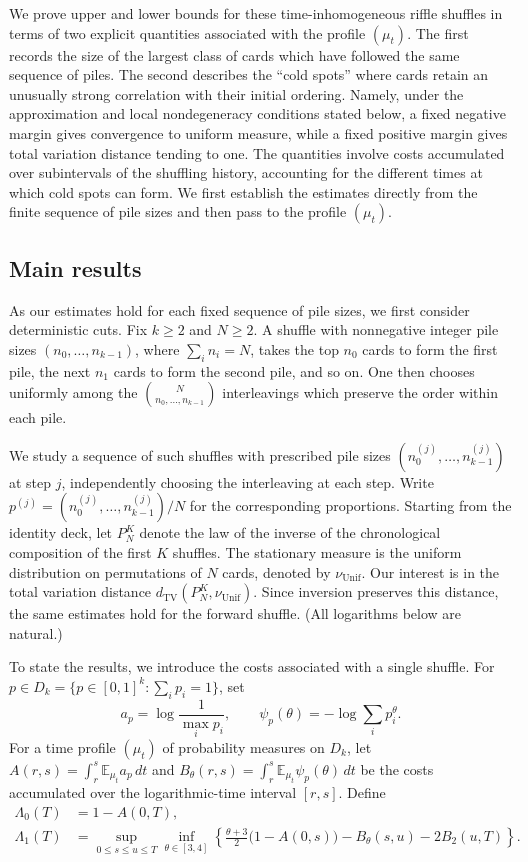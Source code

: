 \documentclass[11pt]{article}
\numberwithin{equation}{section}
\theoremstyle{definition}
\theoremstyle{remark}
\newcommand{\E}{\mathbb E}
\newcommand{\TV}{\mathrm{TV}}
\newcommand{\Unif}{\mathrm{Unif}}
\newcommand{\dTV}{d_{\TV}}
\newcommand{\nuUnif}{\nu_{\Unif}}
\newcommand{\1}{\mathbf 1}
\begin{document}
We prove upper and lower bounds for these time-inhomogeneous riffle
shuffles in terms of two explicit quantities associated with the profile
$(\mu_t)$. The first records the size of the largest class of cards which
have followed the same sequence of piles. The second describes the
``cold spots'' where cards retain an unusually strong correlation with
their initial ordering. Namely, under the approximation and local
nondegeneracy conditions stated below, a fixed negative margin gives
convergence to uniform measure, while a fixed positive margin gives total
variation distance tending to one. The quantities involve costs accumulated
over subintervals of the shuffling history, accounting for the different
times at which cold spots can form. We first establish the estimates
directly from the finite sequence of pile sizes and then pass to the
profile $(\mu_t)$.

\subsection{Main results}

As our estimates hold for each fixed sequence of pile sizes, we first
consider deterministic cuts. Fix $k\ge2$ and $N\ge2$. A shuffle with
nonnegative integer pile sizes $(n_0,\ldots,n_{k-1})$, where $\sum_i n_i=N$,
takes the top $n_0$ cards to form the first pile, the next $n_1$ cards to form the
second pile, and so on. One then chooses uniformly among the
$\binom{N}{n_0,\ldots,n_{k-1}}$ interleavings which preserve the order
within each pile.

We study a sequence of such shuffles with prescribed pile sizes
$(n_0^{(j)},\ldots,n_{k-1}^{(j)})$ at step $j$, independently choosing
the interleaving at each step. Write
$p^{(j)}=(n_0^{(j)},\ldots,n_{k-1}^{(j)})/N$ for the corresponding
proportions. Starting from the identity deck, let $P_N^K$ denote the law
of the inverse of the chronological composition of the first $K$
shuffles. The stationary measure is the uniform distribution on
permutations of $N$ cards, denoted by $\nuUnif$. Our interest is in the
total variation distance $\dTV(P_N^K,\nuUnif)$. Since inversion preserves
this distance, the same estimates hold for the forward shuffle.
(All logarithms below are natural.)

To state the results, we introduce the costs associated with a single
shuffle. For $p\in D_k=\{p\in[0,1]^k:\sum_i p_i=1\}$, set
\[
 a_p=\log\frac1{\max_i p_i},\qquad
 \psi_p(\theta)=-\log\sum_i p_i^\theta.
\]
For a time profile $(\mu_t)$ of probability measures on $D_k$, let
$A(r,s)=\int_r^s\E_{\mu_t}a_p\,dt$ and
$B_\theta(r,s)=\int_r^s\E_{\mu_t}\psi_p(\theta)\,dt$ be the costs
accumulated over the logarithmic-time interval $[r,s]$. Define
\begin{align*}
 \Lambda_0(T)&=1-A(0,T),\\
 \Lambda_1(T)&=\sup_{0\le s\le u\le T}\inf_{\theta\in[3,4]}
 \left\{\frac{\theta+3}{2}\bigl(1-A(0,s)\bigr)
       -B_\theta(s,u)-2B_2(u,T)\right\}.
\end{align*}
\end{document}
